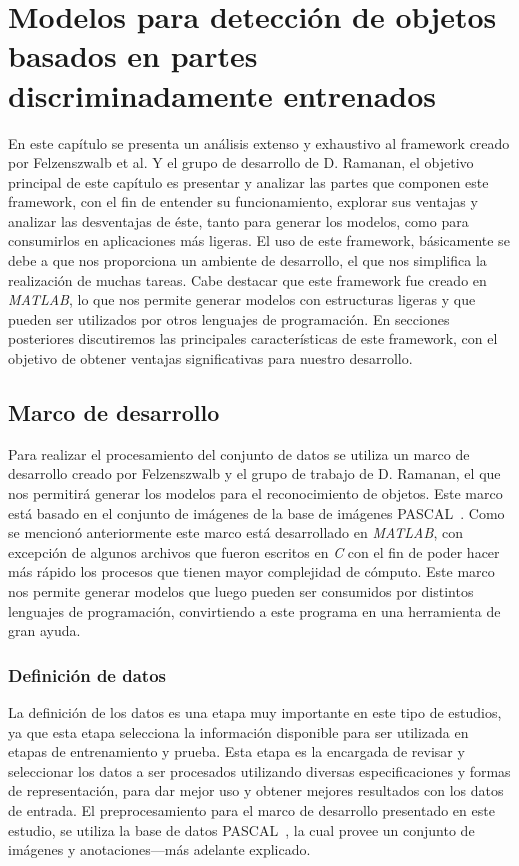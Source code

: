 \chapter[Modelos basados en partes ]{Modelos para detección de objetos basados en partes discriminadamente entrenados }\label{ch:capitulo4}
En este capítulo se presenta un análisis extenso y exhaustivo al framework creado por Felzenszwalb et al. Y el grupo de desarrollo de D. Ramanan, el objetivo principal de este capítulo es presentar y analizar las partes que componen este framework, con el fin de entender su funcionamiento, explorar sus ventajas y analizar las desventajas de éste, tanto para generar los modelos, como para consumirlos en aplicaciones más ligeras. El uso de este framework, básicamente se debe a que nos proporciona un ambiente de desarrollo, el que nos simplifica la realización de muchas tareas. Cabe destacar que este framework fue creado en \textit{MATLAB}, lo que nos permite generar modelos con estructuras ligeras y que pueden ser utilizados por otros lenguajes de programación. En secciones posteriores discutiremos las principales características de este framework, con el objetivo de obtener ventajas significativas para nuestro desarrollo.

\section{Marco de desarrollo}\label{sec:framework}
Para realizar el procesamiento del conjunto de datos se utiliza un marco de desarrollo creado por Felzenszwalb y el grupo de trabajo de D. Ramanan, el que nos permitirá generar los modelos para el reconocimiento de objetos. Este marco está basado en el conjunto de imágenes de la base de imágenes PASCAL~\cite{Everingham2010}. Como se mencionó anteriormente este marco está desarrollado en \textit{MATLAB}, con excepción de algunos archivos que fueron escritos en \textit{C} con el fin de poder hacer más rápido los procesos que tienen mayor complejidad de cómputo. Este marco nos permite generar modelos que luego pueden ser consumidos por distintos lenguajes de programación, convirtiendo a este programa en una herramienta de gran ayuda.

\subsection{Definición de datos}\label{sec:datos}
La definición de los datos es una etapa muy importante en este tipo de estudios, ya que esta etapa selecciona la información disponible para ser utilizada en etapas de entrenamiento y prueba. Esta etapa es la encargada de revisar y seleccionar los datos a ser procesados utilizando diversas especificaciones y formas de representación, para dar mejor uso y obtener mejores resultados con los datos de entrada. El preprocesamiento para el marco de desarrollo presentado en este estudio, se utiliza la base de datos PASCAL~\cite{Everingham2010}, la cual provee un conjunto de imágenes y anotaciones---más adelante explicado.

